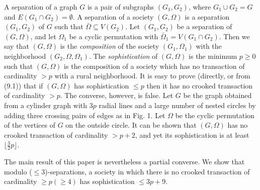 A separation of a graph $G$ is a pair of subgraphs $(G_1, G_2)$, where $G_1 \cup G_2 = G$ and $E(G_1 \cap G_2) = \emptyset$. A separation of a society $(G, \Omega)$ is a separation $(G_1, G_2)$ of $G$ such that $\bar{\Omega} \subseteq V(G_2)$. Let $(G_1, G_2)$ be a separation of $(G, \Omega)$, and let $\Omega_1$ be a cyclic permutation with $\bar{\Omega}_1 = V(G_1 \cap G_2)$. Then we say that $(G, \Omega)$ is the \textit{composition} of the society $(G_1, \Omega_1)$ with the neighborhood $(G_2, \Omega, \Omega_1)$. The \textit{sophistication} of $(G, \Omega)$ is the minimum $p \ge 0$ such that $(G, \Omega)$ is the composition of a society which has no transaction of cardinality $> p$ with a rural neighborhood. It is easy to prove (directly, or from (9.1)) that if $(G, \Omega)$ has sophistication $\le p$ then it has no crooked transaction of cardinality $> p$. The converse, however, is false. Let $G$ be the graph obtained from a cylinder graph with $3p$ radial lines and a large number of nested circles by adding three crossing pairs of edges as in Fig. 1. Let $\Omega$ be the cyclic permutation of the vertices of $G$ on the outside circle. It can be shown that $(G, \Omega)$ has no crooked transaction of cardinality $> p + 2$, and yet its sophistication is at least $\lfloor \frac{3}{2} p \rfloor$.

The main result of this paper is nevertheless a partial converse. We show that modulo ($\le 3$)-separations, a society in which there is no crooked transaction of cardinality $\ge p (\ge 4)$ has sophistication $\le 3p + 9$.

